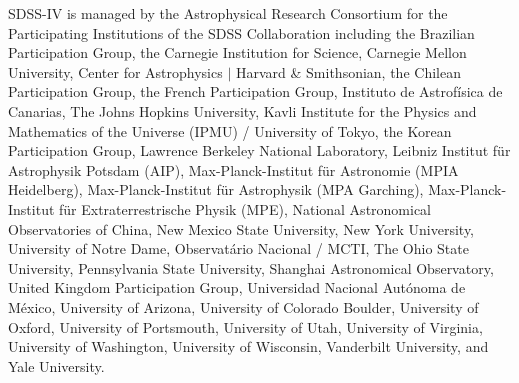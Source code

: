 \documentclass[twocolumn]{aastex631}
\begin{document}
\begin{acknowledgments}
SDSS-IV is managed by the Astrophysical Research Consortium for the Participating Institutions of the SDSS Collaboration including the Brazilian Participation Group, the Carnegie Institution for Science, Carnegie Mellon University, Center for Astrophysics $|$ Harvard \& Smithsonian, the Chilean Participation Group, the French Participation Group, Instituto de Astrof\'isica de Canarias, The Johns Hopkins University, Kavli Institute for the Physics and Mathematics of the Universe (IPMU) / University of Tokyo, the Korean Participation Group, Lawrence Berkeley National Laboratory, Leibniz Institut f\"ur Astrophysik Potsdam (AIP),  Max-Planck-Institut f\"ur Astronomie (MPIA Heidelberg), Max-Planck-Institut f\"ur Astrophysik (MPA Garching), Max-Planck-Institut f\"ur Extraterrestrische Physik (MPE), National Astronomical Observatories of China, New Mexico State University, New York University, University of Notre Dame, Observat\'ario Nacional / MCTI, The Ohio State University, Pennsylvania State University, Shanghai Astronomical Observatory, United Kingdom Participation Group, Universidad Nacional Aut\'onoma de M\'exico, University of Arizona, University of Colorado Boulder, University of Oxford, University of Portsmouth, University of Utah, University of Virginia, University of Washington, University of Wisconsin, Vanderbilt University, and Yale University.
\end{acknowledgments}

{}









\end{document}
